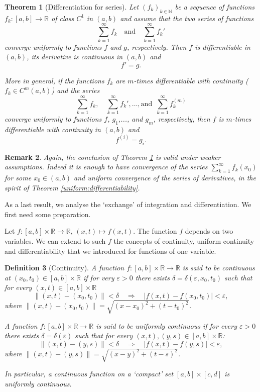\documentclass[a4paper,reqno]{amsart}
\numberwithin{equation}{section}
\newtheorem{definition}{Definition}[section]
\newtheorem{theorem}[definition]{Theorem}
\newtheorem{remark}[definition]{Remark}
\def\N{\mathbb{N}}
\def\R{\mathbb{R}}
\begin{document}
\begin{theorem}[Differentiation for series]\label{series:d}
Let $(f_k)_{k\in \N}$ be a sequence of functions $f_k:[a,b]\to \R$ of class $C^1$ in $(a,b)$ and assume that the two series of functions
$$
\sum_{k=1}^\infty f_k \quad \textrm{and} \quad \sum_{k=1}^\infty f_k'
$$
converge uniformly to functions $f$ and $g$, respectively. Then $f$ is differentiable in $(a,b)$, its derivative is continuous in $(a,b)$ and
$$
f'=g.
$$

More in general, if the functions $f_k$ are $m$-times differentiable with continuity ($f_k\in C^m(a,b)$) and the series
$$
\sum_{k=1}^\infty f_k, \quad \sum_{k=1}^\infty f_k',  \dots , \textrm{and }  \, \sum_{k=1}^\infty f_k^{(m)}
$$
converge uniformly to functions $f$, $g_1$,..., and $g_m$, respectively, then $f$ is $m$-times differentiable with continuity in $(a,b)$ and
$$
f^{(i)}=g_i.
$$
\end{theorem}

\begin{remark}
Again, the conclusion of Theorem \ref{series:d} is valid under weaker assumptions. Indeed it is enough to have convergence of the series $\sum_{k=1}^\infty f_k(x_0)$ for some $x_0\in (a,b)$ and
uniform convergence of the series of derivatives, in the spirit of Theorem \ref{uniform:differentiability}.
\end{remark}


As a last result, we analyse the `exchange' of integration and differentiation. We first need some preparation.

Let $f:[a,b]\times \R \to \R$, $(x,t)\mapsto f(x,t)$. The function $f$ depends on two variables. We can extend to such $f$ the concepts of continuity, uniform continuity and differentiability that we introduced for
functions of one variable.

\begin{definition}[Continuity]
A function $f:[a,b]\times\R \to \R$ is said to be continuous at $(x_0,t_0) \in [a,b]\times\R$ if for very $\varepsilon>0$ there exists $\delta =\delta(\varepsilon,x_0,t_0)$ such that for every $(x,t)\in [a,b]\times \R$
$$
\|(x,t)-(x_0,t_0)\|<\delta \quad \Rightarrow \quad |f(x,t) - f(x_0,t_0)| < \varepsilon,
$$
where $\|(x,t)-(x_0,t_0)\| = \sqrt{(x-x_0)^2+(t-t_0)^2}$.

\bigskip
A function $f:[a,b]\times \R \to \R$ is said to be uniformly continuous if for every $\varepsilon>0$ there exists $\delta =\delta(\varepsilon)$ such that for every $(x,t), (y,s)\in [a,b]\times \R$:
$$
\|(x,t)-(y,s)\|<\delta \quad \Rightarrow \quad |f(x,t) - f(y,s)| < \varepsilon,
$$
where $\|(x,t)-(y,s)\| = \sqrt{(x-y)^2+(t-s)^2}$.

\medskip
In particular, a continuous function on a `compact' set $[a,b]\times [c,d]$ is uniformly continuous.
\end{definition}
\end{document}
